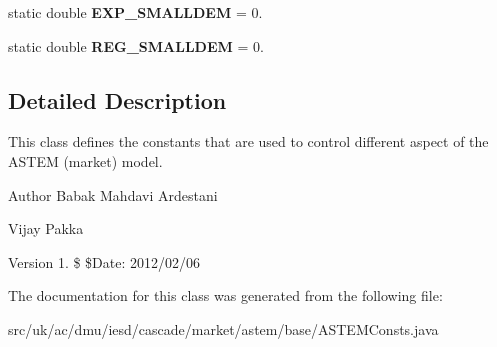 \begin{DoxyCompactItemize}
\item 
\hypertarget{classuk_1_1ac_1_1dmu_1_1iesd_1_1cascade_1_1market_1_1astem_1_1base_1_1_a_s_t_e_m_consts_a0bd982a80f7aa68446260545735c30bc}{static double {\bfseries E\-X\-P\-\_\-\-S\-M\-A\-L\-L\-D\-E\-M} = 0.}\label{classuk_1_1ac_1_1dmu_1_1iesd_1_1cascade_1_1market_1_1astem_1_1base_1_1_a_s_t_e_m_consts_a0bd982a80f7aa68446260545735c30bc}

\item 
\hypertarget{classuk_1_1ac_1_1dmu_1_1iesd_1_1cascade_1_1market_1_1astem_1_1base_1_1_a_s_t_e_m_consts_a8b4188ee83ca1b92d857b443ca280df5}{static double {\bfseries R\-E\-G\-\_\-\-S\-M\-A\-L\-L\-D\-E\-M} = 0.}\label{classuk_1_1ac_1_1dmu_1_1iesd_1_1cascade_1_1market_1_1astem_1_1base_1_1_a_s_t_e_m_consts_a8b4188ee83ca1b92d857b443ca280df5}

\end{DoxyCompactItemize}


\subsection{Detailed Description}
This class defines the constants that are used to control different aspect of the A\-S\-T\-E\-M (market) model. 

\begin{DoxyAuthor}{Author}
Babak Mahdavi Ardestani 

Vijay Pakka 
\end{DoxyAuthor}
\begin{DoxyVersion}{Version}
1. \$ \$\-Date\-: 2012/02/06 
\end{DoxyVersion}


The documentation for this class was generated from the following file\-:\begin{DoxyCompactItemize}
\item 
src/uk/ac/dmu/iesd/cascade/market/astem/base/A\-S\-T\-E\-M\-Consts.\-java\end{DoxyCompactItemize}
